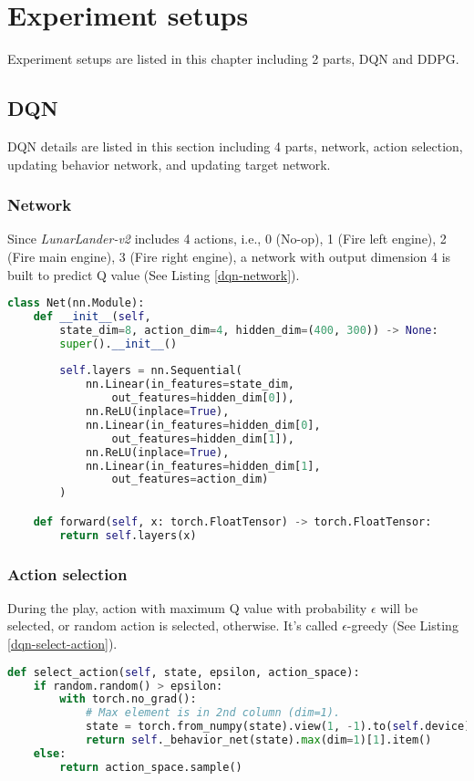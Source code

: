 \chapter{Experiment setups}
\indent
    Experiment setups are listed in this chapter including 2 parts, 
    DQN and DDPG.

\section{DQN}
\indent
    DQN details are listed in this section including 4 parts, 
    network, action selection, updating behavior network, and updating target network.

\subsection{Network}
\indent
    Since \textit{LunarLander-v2} includes 4 actions, 
    i.e., 0 (No-op), 1 (Fire left engine), 2 (Fire main engine), 3 (Fire right engine), 
    a network with output dimension 4 is built to predict Q value (See Listing \ref{dqn-network}).

\begin{lstlisting}[language=Python, caption={Python code of \textcolor{blue}{\textbf{Net}} of DQN.}, label={dqn-network}]
class Net(nn.Module):
    def __init__(self, 
        state_dim=8, action_dim=4, hidden_dim=(400, 300)) -> None:
        super().__init__()
        
        self.layers = nn.Sequential(
            nn.Linear(in_features=state_dim,
                out_features=hidden_dim[0]),
            nn.ReLU(inplace=True),
            nn.Linear(in_features=hidden_dim[0],
                out_features=hidden_dim[1]),
            nn.ReLU(inplace=True),
            nn.Linear(in_features=hidden_dim[1],
                out_features=action_dim)
        )

    def forward(self, x: torch.FloatTensor) -> torch.FloatTensor:
        return self.layers(x)\end{lstlisting}

\subsection{Action selection}
\indent
    During the play, action with maximum Q value with probability $\epsilon$ will be selected, 
    or random action is selected, otherwise. It's called $\epsilon$-greedy (See Listing \ref{dqn-select-action}).

\begin{lstlisting}[language=Python, caption={Python code of \textcolor{blue}{\textbf{select\_action}} of DQN.}, label={dqn-select-action}]
def select_action(self, state, epsilon, action_space):
    if random.random() > epsilon:
        with torch.no_grad():
            # Max element is in 2nd column (dim=1).
            state = torch.from_numpy(state).view(1, -1).to(self.device)
            return self._behavior_net(state).max(dim=1)[1].item()
    else:
        return action_space.sample()\end{lstlisting}

